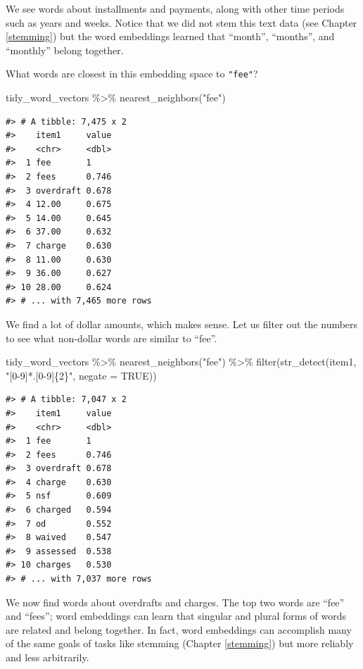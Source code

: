 \documentclass[
]{krantz}
\makeatletter
\newenvironment{Shaded}{\begin{snugshade}}{\end{snugshade}}
\newcommand{\AttributeTok}[1]{\textcolor[rgb]{0.77,0.63,0.00}{#1}}
\newcommand{\ConstantTok}[1]{\textcolor[rgb]{0.00,0.00,0.00}{#1}}
\newcommand{\FunctionTok}[1]{\textcolor[rgb]{0.00,0.00,0.00}{#1}}
\newcommand{\NormalTok}[1]{#1}
\newcommand{\SpecialCharTok}[1]{\textcolor[rgb]{0.00,0.00,0.00}{#1}}
\newcommand{\StringTok}[1]{\textcolor[rgb]{0.31,0.60,0.02}{#1}}
\newenvironment{kframe}{%
\medskip{}
\setlength{\fboxsep}{.8em}
 \def\at@end@of@kframe{}%
 \ifinner\ifhmode%
  \def\at@end@of@kframe{\end{minipage}}%
  \begin{minipage}{\columnwidth}%
 \fi\fi%
 \def\FrameCommand##1{\hskip\@totalleftmargin \hskip-\fboxsep
 \colorbox{shadecolor}{##1}\hskip-\fboxsep
     \hskip-\linewidth \hskip-\@totalleftmargin \hskip\columnwidth}%
 \MakeFramed {\advance\hsize-\width
   \@totalleftmargin\z@ \linewidth\hsize
   \@setminipage}}%
 {\par\unskip\endMakeFramed%
 \at@end@of@kframe}
\renewenvironment{Shaded}{\begin{kframe}}{\end{kframe}}
\makeatother
\begin{document}
We see words about installments and payments, along with other time periods such as years and weeks. Notice that we did not stem this text data (see Chapter \ref{stemming}) but the word embeddings learned that ``month'', ``months'', and ``monthly'' belong together.

What words are closest in this embedding space to \texttt{"fee"}?

\begin{Shaded}
\begin{Highlighting}[]
\NormalTok{tidy\_word\_vectors }\SpecialCharTok{\%\textgreater{}\%}
    \FunctionTok{nearest\_neighbors}\NormalTok{(}\StringTok{"fee"}\NormalTok{)}
\end{Highlighting}
\end{Shaded}

\begin{verbatim}
#> # A tibble: 7,475 x 2
#>    item1     value
#>    <chr>     <dbl>
#>  1 fee       1    
#>  2 fees      0.746
#>  3 overdraft 0.678
#>  4 12.00     0.675
#>  5 14.00     0.645
#>  6 37.00     0.632
#>  7 charge    0.630
#>  8 11.00     0.630
#>  9 36.00     0.627
#> 10 28.00     0.624
#> # ... with 7,465 more rows
\end{verbatim}

We find a lot of dollar amounts, which makes sense. Let us filter out the numbers to see what non-dollar words are similar to ``fee''.

\begin{Shaded}
\begin{Highlighting}[]
\NormalTok{tidy\_word\_vectors }\SpecialCharTok{\%\textgreater{}\%}
  \FunctionTok{nearest\_neighbors}\NormalTok{(}\StringTok{"fee"}\NormalTok{) }\SpecialCharTok{\%\textgreater{}\%}
  \FunctionTok{filter}\NormalTok{(}\FunctionTok{str\_detect}\NormalTok{(item1, }\StringTok{"[0{-}9]*.[0{-}9]\{2\}"}\NormalTok{, }\AttributeTok{negate =} \ConstantTok{TRUE}\NormalTok{))}
\end{Highlighting}
\end{Shaded}

\begin{verbatim}
#> # A tibble: 7,047 x 2
#>    item1     value
#>    <chr>     <dbl>
#>  1 fee       1    
#>  2 fees      0.746
#>  3 overdraft 0.678
#>  4 charge    0.630
#>  5 nsf       0.609
#>  6 charged   0.594
#>  7 od        0.552
#>  8 waived    0.547
#>  9 assessed  0.538
#> 10 charges   0.530
#> # ... with 7,037 more rows
\end{verbatim}

We now find words about overdrafts and charges. The top two words are ``fee'' and ``fees''; word embeddings can learn that singular and plural forms of words are related and belong together. In fact, word embeddings can accomplish many of the same goals of tasks like stemming (Chapter \ref{stemming}) but more reliably and less arbitrarily.
\end{document}
